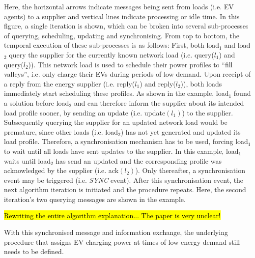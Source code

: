 Here, the horizontal arrows indicate messages being sent from loads (i.e. EV agents) to a supplier and vertical lines indicate processing or idle time.
In this figure, a single iteration is shown, which can be broken into several sub-processes of querying, scheduling, updating and synchronising.
From top to bottom, the temporal execution of these sub-processes is as follows:
First, both load$_1$ and load$_2$ query the supplier for the currently known network load (i.e. query($l_1$) and query($l_2$)).
This network load is used to schedule their power profiles to ``fill valleys'', i.e. only charge their EVs during periods of low demand.
Upon receipt of a  reply from the energy supplier (i.e. reply($l_1$) and reply($l_2$)), both loads immediately start scheduling these profiles.
As shown in the example, load$_1$ found a solution before load$_2$ and can therefore inform the supplier about its intended load profile sooner, by sending an update (i.e. update$(l_1)$) to the supplier.
Subsequently querying the supplier for an updated network load would be premature, since other loads (i.e. load$_2$) has not yet generated and updated its load profile.
Therefore, a synchronisation mechanism has to be used, forcing load$_1$ to wait until all loads have sent updates to the supplier.
In this example, load$_1$ waits until load$_2$ has send an updated and the corresponding profile was acknowledged by the supplier (i.e. ack$(l_2)$).
Only thereafter, a synchronisation event may be triggered (i.e. \textit{SYNC} event).
After this synchronisation event, the next algorithm iteration is initiated and the procedure repeats.
Here, the second iteration's two querying messages are shown in the example.


\hl{Rewriting the entire algorithm explanation... The paper is very unclear!}

With this synchronised message and information exchange, the underlying procedure that assigns EV charging power at times of low energy demand still needs to be defined.



